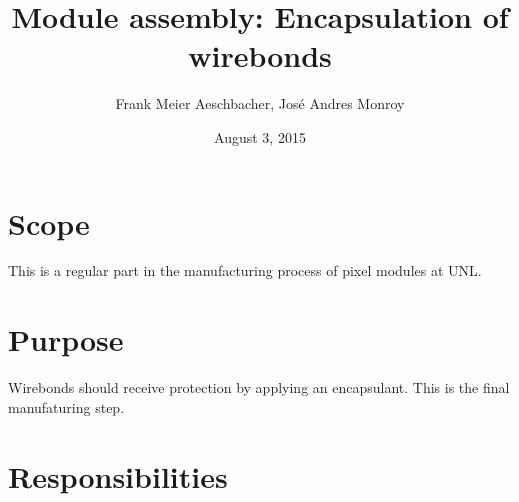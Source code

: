 \documentclass[12pt]{unlsilabsop}
\title{Module assembly: Encapsulation of wirebonds}
\date{August 3, 2015}
\author{Frank Meier Aeschbacher, José Andres Monroy}
\begin{document}
\maketitle

\section{Scope}
This is a regular part in the manufacturing process of pixel modules at UNL.

\section{Purpose}
Wirebonds should receive protection by applying an encapsulant. This is the final manufaturing step.


\section{Responsibilities}

\end{document}
